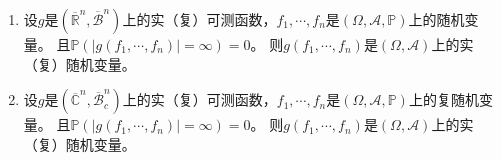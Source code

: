 \documentclass{ctexart}
\begin{document}
\begin{problem}\label{pro:2.5.3}
  \begin{enumerate}
    \item   设\(g \)是\((\overline{\mathbb{R}}^n,\overline{\mathcal{B}}^n) \)上的实（复）可测函数，\(f_1,\cdots,f_n \)是\((\Omega,\mathcal{A},\mathbb{P}) \)上的随机变量。
      且\(\mathbb{P}(|g(f_1,\cdots,f_n)|=\infty)=0 \)。 则\(g(f_1,\cdots,f_n) \)是\((\Omega,\mathcal{A}) \)上的实（复）随机变量。
    \item   设\(g \)是\((\overline{\mathbb{C}}^n,\overline{\mathcal{B}}^n_c) \)上的实（复）可测函数，\(f_1,\cdots,f_n \)是\((\Omega,\mathcal{A},\mathbb{P}) \)上的复随机变量。
      且\(\mathbb{P}(|g(f_1,\cdots,f_n)|=\infty)=0 \)。 则\(g(f_1,\cdots,f_n) \)是\((\Omega,\mathcal{A}) \)上的实（复）随机变量。
  \end{enumerate}
\end{problem}
\end{document}
